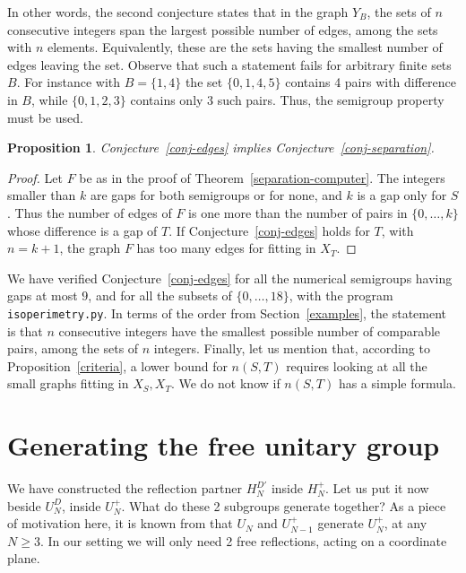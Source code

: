 \documentclass[11pt,a4paper]{article}
\newtheorem{prop}[thm]{Proposition}
\begin{document}
In other words, the second conjecture states that in the graph $Y_B$, the sets of $n$ consecutive integers span the largest possible number of edges, among the sets with $n$ elements. Equivalently, these are the sets having the smallest number of edges leaving the set. Observe that such a statement fails for arbitrary finite sets $B$. For instance with $B=\{1,4\}$ the set $\{0,1,4,5\}$ contains 4 pairs with difference in $B$, while $\{0,1,2,3\}$ contains only 3 such pairs. Thus, the semigroup property must be used.

\begin{prop}
Conjecture~\ref{conj-edges} implies Conjecture~\ref{conj-separation}.
\end{prop}

\begin{proof}
Let $F$ be as in the proof of Theorem~\ref{separation-computer}. The integers smaller than $k$ are gaps for both semigroups or for none, and $k$ is a gap only for $S$. Thus the number of edges of $F$ is one more than the number of pairs in $\{0,\ldots,k\}$ whose difference is a gap of $T$. If Conjecture~\ref{conj-edges} holds for $T$, with $n=k+1$, the graph $F$ has too many edges for fitting in $X_T$.
\end{proof}

We have verified Conjecture~\ref{conj-edges} for all the numerical semigroups having gaps at most $9$, and for all the subsets of $\{0,\ldots,18\}$, with the program \texttt{isoperimetry.py}. In terms of the order from Section~\ref{examples}, the statement is that $n$ consecutive integers have the smallest possible number of comparable pairs, among the sets of $n$ integers. Finally, let us mention that, according to Proposition~\ref{criteria}, a lower bound for $n(S,T)$ requires looking at all the small graphs fitting in $X_S,X_T$. We do not know if $n(S,T)$ has a simple formula.

\section{Generating the free unitary group}\label{joint-section}

We have constructed the reflection partner $H_N^{D'}$ inside $H_N^+$. Let us put it now beside $U_N^D$, inside $U_N^+$. What do these 2 subgroups generate together? As a piece of motivation here, it is known from \cite{chir} that $U_N$ and $U_{N-1}^+$ generate $U_N^+$, at any $N\geq3$. In our setting we will only need 2 free reflections, acting on a coordinate plane.
\end{document}
